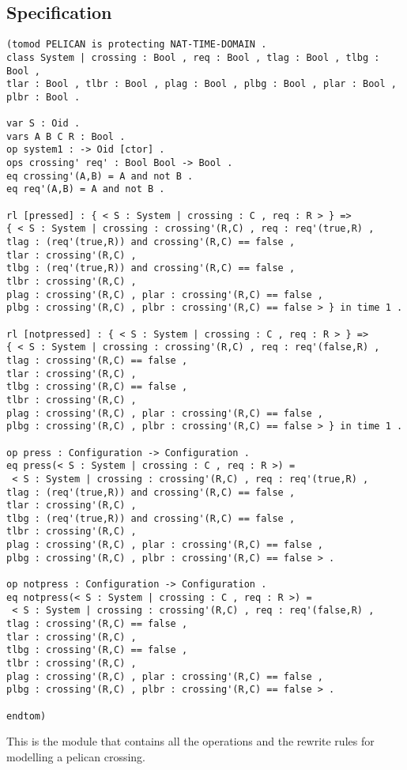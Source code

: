\documentclass{article}
\begin{document}
\subsection{Specification}
\begin{verbatim}
(tomod PELICAN is protecting NAT-TIME-DOMAIN .
class System | crossing : Bool , req : Bool , tlag : Bool , tlbg : Bool , 
tlar : Bool , tlbr : Bool , plag : Bool , plbg : Bool , plar : Bool , plbr : Bool .

var S : Oid .
vars A B C R : Bool .
op system1 : -> Oid [ctor] .
ops crossing' req' : Bool Bool -> Bool .
eq crossing'(A,B) = A and not B .
eq req'(A,B) = A and not B .

rl [pressed] : { < S : System | crossing : C , req : R > } => 
{ < S : System | crossing : crossing'(R,C) , req : req'(true,R) , 
tlag : (req'(true,R)) and crossing'(R,C) == false ,
tlar : crossing'(R,C) ,
tlbg : (req'(true,R)) and crossing'(R,C) == false , 
tlbr : crossing'(R,C) ,
plag : crossing'(R,C) , plar : crossing'(R,C) == false ,
plbg : crossing'(R,C) , plbr : crossing'(R,C) == false > } in time 1 .

rl [notpressed] : { < S : System | crossing : C , req : R > } => 
{ < S : System | crossing : crossing'(R,C) , req : req'(false,R) , 
tlag : crossing'(R,C) == false ,
tlar : crossing'(R,C) ,
tlbg : crossing'(R,C) == false , 
tlbr : crossing'(R,C) ,
plag : crossing'(R,C) , plar : crossing'(R,C) == false ,
plbg : crossing'(R,C) , plbr : crossing'(R,C) == false > } in time 1 .

op press : Configuration -> Configuration .
eq press(< S : System | crossing : C , req : R >) = 
 < S : System | crossing : crossing'(R,C) , req : req'(true,R) , 
tlag : (req'(true,R)) and crossing'(R,C) == false ,
tlar : crossing'(R,C) ,
tlbg : (req'(true,R)) and crossing'(R,C) == false , 
tlbr : crossing'(R,C) ,
plag : crossing'(R,C) , plar : crossing'(R,C) == false ,
plbg : crossing'(R,C) , plbr : crossing'(R,C) == false > .

op notpress : Configuration -> Configuration .
eq notpress(< S : System | crossing : C , req : R >) = 
 < S : System | crossing : crossing'(R,C) , req : req'(false,R) , 
tlag : crossing'(R,C) == false ,
tlar : crossing'(R,C) ,
tlbg : crossing'(R,C) == false , 
tlbr : crossing'(R,C) ,
plag : crossing'(R,C) , plar : crossing'(R,C) == false ,
plbg : crossing'(R,C) , plbr : crossing'(R,C) == false > .

endtom)
\end{verbatim}
This is the module that contains all the operations and the rewrite rules for modelling a pelican crossing.
\end{document}
